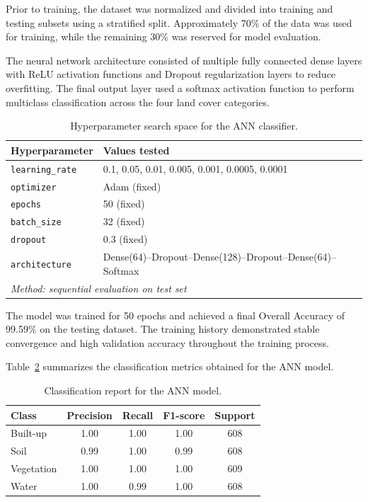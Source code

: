 \documentclass{article}
\begin{document}
Prior to training, the dataset was normalized and divided into training and testing subsets using a stratified split. Approximately 70\% of the data was
used for training, while the remaining 30\% was reserved for model evaluation.

The neural network architecture consisted of multiple fully connected dense layers with ReLU activation functions and Dropout regularization layers to
reduce overfitting. The final output layer used a softmax activation function to perform multiclass classification across the four land cover categories.

\begin{table}[H]
    \centering
    \caption{Hyperparameter search space for the ANN classifier.}
    \label{tab:ann_hpo}
    \begin{tabular}{ll}
        \hline
        \textbf{Hyperparameter} & \textbf{Values tested} \\
        \hline
        \texttt{learning\_rate} & 0.1, 0.05, 0.01, 0.005, 0.001, 0.0005, 0.0001 \\
        \texttt{optimizer}      & Adam (fixed) \\
        \texttt{epochs}         & 50 (fixed) \\
        \texttt{batch\_size}    & 32 (fixed) \\
        \texttt{dropout}        & 0.3 (fixed) \\
        \texttt{architecture}   & Dense(64)--Dropout--Dense(128)--Dropout--Dense(64)--Softmax \\
        \hline
        \multicolumn{2}{l}{\textit{Method: sequential evaluation on test set}} \\
        \hline
    \end{tabular}
\end{table}

The model was trained for 50 epochs and achieved a final Overall Accuracy of 99.59\% on the testing dataset. The training history demonstrated stable
convergence and high validation accuracy throughout the training process.

Table~\ref{tab:ann_results} summarizes the classification metrics obtained for the ANN model.

\begin{table}[h]
    \centering
    \caption{Classification report for the ANN model.}
    \label{tab:ann_results}
    \begin{tabular}{lcccc}
        \hline
        \textbf{Class} & \textbf{Precision} & \textbf{Recall} & \textbf{F1-score} & \textbf{Support} \\
        \hline
        Built-up   & 1.00 & 1.00 & 1.00 & 608 \\
        Soil       & 0.99 & 1.00 & 0.99 & 608 \\
        Vegetation & 1.00 & 1.00 & 1.00 & 609 \\
        Water      & 1.00 & 0.99 & 1.00 & 608 \\
        \hline
    \end{tabular}
\end{table}
\end{document}
